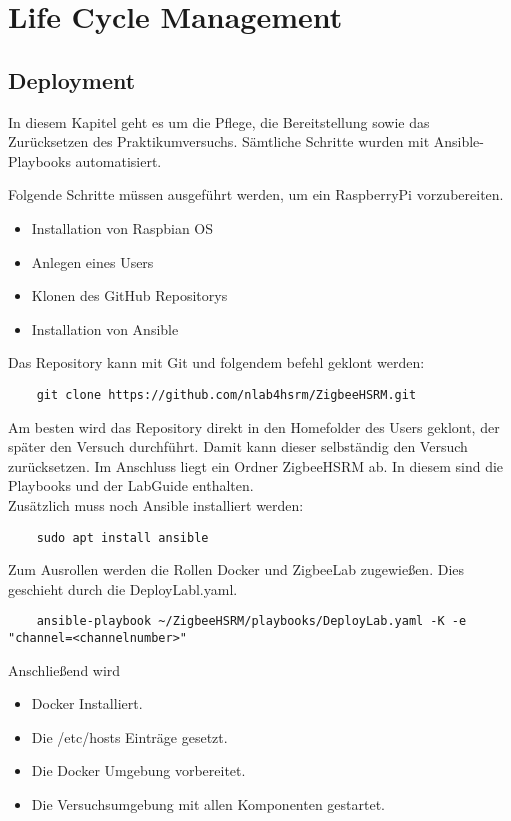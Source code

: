 \chapter{Life Cycle Management}
\section{Deployment}
In diesem Kapitel geht es um die Pflege, die Bereitstellung sowie das Zurücksetzen des Praktikumversuchs. Sämtliche Schritte wurden mit Ansible-Playbooks
automatisiert.

Folgende Schritte müssen ausgeführt werden, um ein RaspberryPi vorzubereiten.
\begin{itemize}
    \item Installation von Raspbian OS
    \item Anlegen eines Users
    \item Klonen des GitHub Repositorys 
    \item Installation von Ansible
\end{itemize}

Das Repository kann mit Git und folgendem befehl geklont werden:
\begin{lstlisting}
    git clone https://github.com/nlab4hsrm/ZigbeeHSRM.git
\end{lstlisting}
Am besten wird das Repository direkt in den Homefolder des Users geklont, der später den Versuch durchführt. Damit kann dieser selbständig den Versuch zurücksetzen. Im Anschluss liegt ein Ordner
\grqq ZigbeeHSRM\grqq{} ab. In diesem sind die Playbooks und der LabGuide enthalten.\\
Zusätzlich muss noch Ansible installiert werden:
\begin{lstlisting}
    sudo apt install ansible
\end{lstlisting}


Zum Ausrollen werden die Rollen \grqq Docker\grqq{} und \grqq ZigbeeLab\grqq{} zugewießen. Dies geschieht durch die DeployLabl.yaml.
\begin{lstlisting}
    ansible-playbook ~/ZigbeeHSRM/playbooks/DeployLab.yaml -K -e "channel=<channelnumber>"
\end{lstlisting}

Anschließend wird
\begin{itemize}
    \item Docker Installiert.
    \item Die /etc/hosts Einträge gesetzt.
    \item Die Docker Umgebung vorbereitet.
    \item Die Versuchsumgebung mit allen Komponenten gestartet.
\end{itemize}

